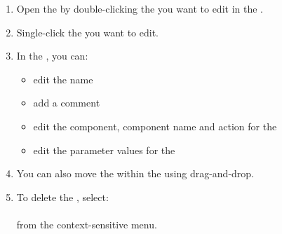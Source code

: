 
\begin{enumerate}
\item Open the \gdtestcaseeditor{} by double-clicking the \gdcase{} you want to edit in the \gdtestcasebrowser{}.  
\item Single-click the \gdstep{} you want to edit. 
\item In the \gdpropview{}, you can:
\begin{itemize}
\item edit the \gdstep{} name
\item add a comment
\item edit the component, component name and action for the \gdstep{}
\item edit the parameter values for the \gdstep{}
\end{itemize}
\item You can also move the \gdstep{} within the \gdcase{} using drag-and-drop. 
\item To delete the \gdstep{}, select:\\
\\
from the context-sensitive menu. 
\end{enumerate}








